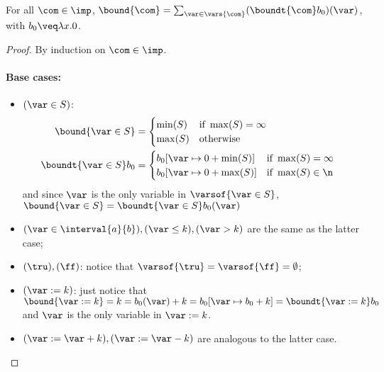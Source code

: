 \begin{lemma}
  For all \(\com \in \imp\), \(\bound{\com}=\sum_{\var\in \vars{\com}}
  (\boundt{\com}b_0)(\var)\), with \(b_0\veq \lambda x.0\).
\end{lemma}
\begin{proof}
  By induction on \(\com\in \imp\).
  \paragraph*{Base cases: \\}
  \noindent
  \begin{itemize}[label={}]
  \item \((\var \in S)\):
    \begin{align*}
      \bound{\var\in S} & = \begin{cases} \min(S) & \text{if } \max(S) = \infty \\ \max(S) & \text{otherwise} \end{cases} & \\
      \boundt{\var \in S}b_0 & = \begin{cases} b_0[\var \mapsto 0 + \min(S)] & \text{if } \max(S) = \infty \\ b_0[\var \mapsto 0 + \max(S)] & \text{if } \max(S) \in \n \end{cases} &
    \end{align*}
    and since \(\var\) is the only variable in \(\varsof{\var \in
      S}\), \(\bound{\var\in S} = \boundt{\var \in S}b_0(\var)\)
  \item \((\var \in \interval{a}{b}), (\var \leq k), (\var > k)\) are
    the same as the latter case;
  \item \((\tru), (\ff)\): notice that \(\varsof{\tru} = \varsof{\ff}
    = \emptyset\);
  \item \((\var := k)\): just notice that
    \(\bound{\var := k} = k = b_0(\var) + k = b_0[\var \mapsto b_0 +
    k] = \boundt{\var := k }b_0\) and \(\var\) is the only variable in
    \(\var := k\).
  \item \((\var := \var + k), (\var := \var - k)\) are analogous to
    the latter case.
  \end{itemize}

  \noindent

\end{proof}
